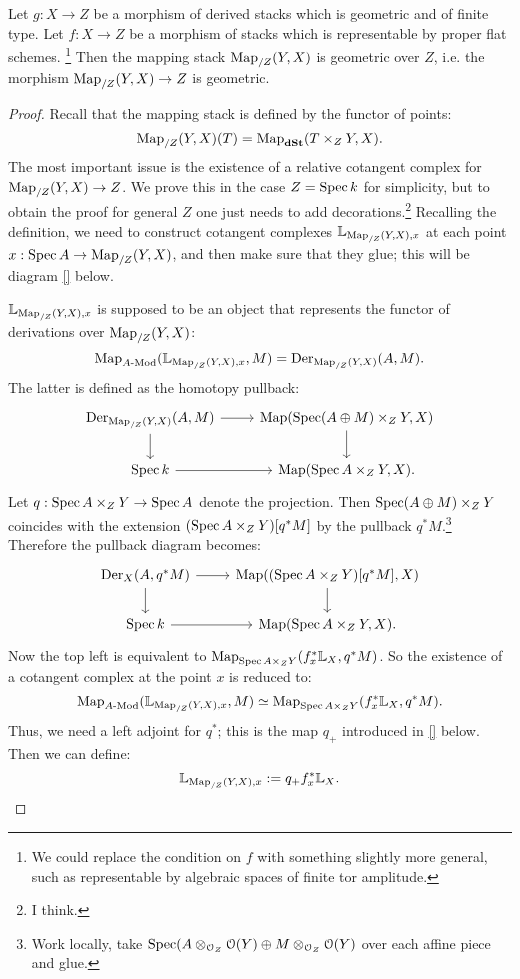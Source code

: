 \begin{thm}
\label{thm:mapping_stack_geometric}
Let $g: X \to Z$ be a morphism of derived stacks which is geometric and of finite type. Let $f:X\to Z$ be a morphism of stacks
which is representable by proper flat schemes. \footnote{We could replace the condition on $f$ with something slightly more
general, such as representable by algebraic spaces of finite tor amplitude.} Then the mapping stack $\operatorname{Map}_{/Z}(Y,X)$ is geometric
over $Z$, i.e. the morphism $\operatorname{Map}_{/Z}(Y,X) \to Z$ is geometric.
\end{thm}
\begin{proof}
Recall that the mapping stack is defined by the functor of points:
\[	 \operatorname{Map}_{/Z}(Y,X) (T) = \operatorname{Map}_{\mathbf{dSt}}(T\times_Z Y, X). 	\]
The most important issue is the existence of a relative cotangent complex for $\operatorname{Map}_{/Z}(Y,X) \to Z$. We prove this in the case
$Z = \operatorname{Spec} k$ for simplicity, but to obtain the proof for general $Z$ one just needs to add decorations.\footnote{I think.}
Recalling the definition, we need to construct cotangent complexes $\mathbb L_{\operatorname{Map}_{/Z}(Y,X),x}$ at each point 
$x: \operatorname{Spec} A \to \operatorname{Map}_{/Z}(Y,X)$, and then make sure that they glue; this will be diagram \ref{} below.

$\mathbb L_{\operatorname{Map}_{/Z}(Y,X),x}$ is supposed to be an object that represents the functor of derivations over $\operatorname{Map}_{/Z}(Y,X)$:
\[	\operatorname{Map}_{A\textrm{-}\mathrm{Mod}}(\mathbb L_{\operatorname{Map}_{/Z}(Y,X),x}, M) = \operatorname{Der}_{\operatorname{Map}_{/Z}(Y,X)}(A,M) .	\]
The latter is defined as the homotopy pullback:
\[
\begin{tikzcd}
\Der_{\Map_{/Z}(Y,X)}(A,M)\arrow{r}\arrow{d} & \Map(\Spec(A\oplus M) \times_Z Y, X)\arrow{d} \\
\Spec k\arrow{r} & \Map(\Spec A \times_Z Y, X).
\end{tikzcd}
\]
Let $q: \operatorname{Spec} A \times_Z Y \to \operatorname{Spec} A$ denote the projection. Then $\operatorname{Spec}(A\oplus M) \times_Z Y$ coincides with the extension
$(\operatorname{Spec} A \times_Z Y)[q^*M]$ by the pullback $q^*M$.\footnote{Work locally, take 
$\operatorname{Spec}(A \otimes_{\mathcal{O}_Z} \mathcal{O}(Y) \oplus M\otimes_{\mathcal{O}_Z} \mathcal{O}(Y)$ over each affine piece and glue.}
Therefore the pullback diagram becomes:
\[
\begin{tikzcd}
\Der_{X}(A,q^*M)\arrow{r}\arrow{d} & \Map((\Spec A \times_Z Y) [q^*M], X)\arrow{d} \\
\Spec k\arrow{r} & \Map(\Spec A \times_Z Y, X).
\end{tikzcd}
\]
Now the top left is equivalent to $\operatorname{Map}_{\operatorname{Spec} A \times_Z Y}(f_x^*\mathbb L_X, q^*M)$. So the existence of a cotangent complex at the
point $x$ is reduced to:
\[	\operatorname{Map}_{A\textrm{-}\mathrm{Mod}}(\mathbb L_{\operatorname{Map}_{/Z}(Y,X),x}, M) \simeq \operatorname{Map}_{\operatorname{Spec} A \times_Z Y}(f_x^*\mathbb L_X, q^*M).	\]
Thus, we need a left adjoint for $q^*$; this is the map $q_+$ introduced in \ref{} below. Then we can define:
\[	\mathbb L_{\operatorname{Map}_{/Z}(Y,X),x} := q_+ f_x^*\mathbb L_X.	\]


\end{proof}
